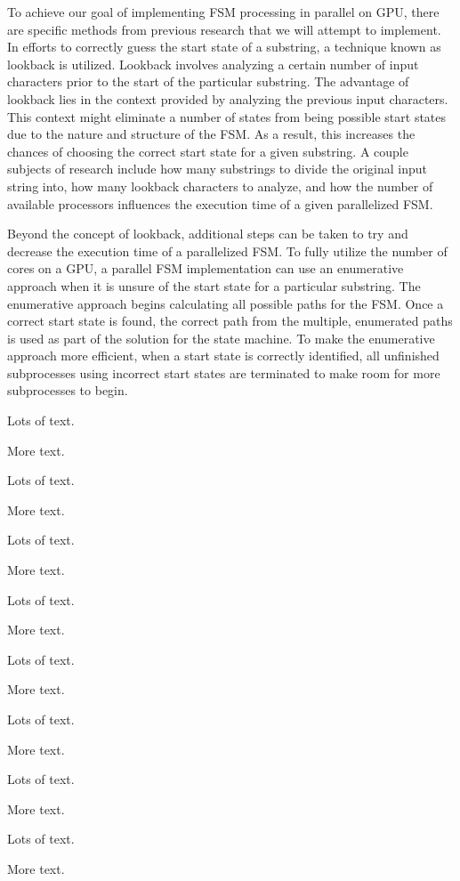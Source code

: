 \documentclass{sigplanconf}
\begin{document}
To achieve our goal of implementing FSM processing in parallel on GPU, there are specific methods from previous research that we will attempt to implement. In efforts to correctly guess the start state of a substring, a technique known as lookback is utilized. Lookback involves analyzing a certain number of input characters prior to the start of the particular substring. The advantage of lookback lies in the context provided by analyzing the previous input characters. This context might eliminate a number of states from being possible start states due to the nature and structure of the FSM. As a result, this increases the chances of choosing the correct start state for a given substring. A couple subjects of research include how many substrings to divide the original input string into, how many lookback characters to analyze, and how the number of available processors influences the execution time of a given parallelized FSM.

Beyond the concept of lookback, additional steps can be taken to try and decrease the execution time of a parallelized FSM. To fully utilize the number of cores on a GPU, a parallel FSM implementation can use an enumerative approach when it is unsure of the start state for a particular substring. The enumerative approach begins calculating all possible paths for the FSM. Once a correct start state is found, the correct path from the multiple, enumerated paths is used as part of the solution for the state machine. To make the enumerative approach more efficient, when a start state is correctly identified, all unfinished subprocesses using incorrect start states are terminated to make room for more subprocesses to begin.

Lots of text.

More text.

Lots of text.

More text.


Lots of text.

More text.

Lots of text.

More text.


Lots of text.

More text.

Lots of text.

More text.

Lots of text.

More text.

Lots of text.

More text.
\end{document}
